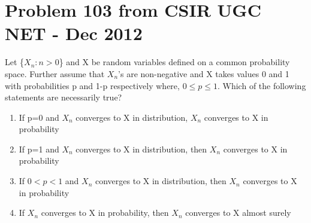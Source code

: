 \documentclass[journal,12pt,twocolumn]{IEEEtran}
\begin{document}
\section{\textbf{Problem 103 from CSIR UGC NET - Dec 2012}}
Let \{$X_n: n>0$\} and X be random variables defined on a common probability space. Further assume that $X_n$'s are non-negative and X takes values 0 and 1 with probabilities p and 1-p respectively where, $0 \leq p \leq 1$. Which of the following statements are necessarily true?
\begin{enumerate}
    \item If p=0 and $X_n$ converges to X in distribution, $X_n$ converges to X in probability
    \item If p=1 and $X_n$ converges to X in distribution, then $X_n$ converges to X in probability
    \item If $0<p<1$ and $X_n$ converges to X in distribution, then $X_n$ converges to X in probability
    \item If $X_n$ converges to X in probability, then $X_n$ converges to X almost surely
\end{enumerate}
\end{document}
